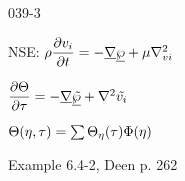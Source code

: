 \begin{mitframe}{039-3}

        
\begin{listone}

\item NSE: $\dens\dfrac{\partial\vvel_{\state}}{\partial{t}}=-\gradop\uline{\dynpress}+\chempot\nabla^2_{\vvel\state}$

			\begin{listtwo}
            
              \item $\dfrac{\partial\dimltemp}{\partial\torque}=-\gradop\uline{\tilde{\dynpress}}+\nabla^2\tilde{\vvel_{\state}}$
                \item$\dimltemp(\intrinsvisc, \torque)=\sum\nolimits\dimltemp_{\intrinsvisc}(\torque)\diss(\intrinsvisc)$
              \item Example 6.4-2, Deen p. 262
              

			\end{listtwo}
\end{listone}

\end{mitframe}